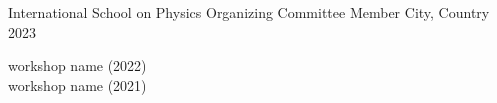 

\begin{cvhonors}

    
  \cvhonor
    {International School on Physics} %
    {Organizing Committee Member} %
    {City, Country} %
    {2023} %
    
\end{cvhonors}


\begin{small} \color{black}
workshop name (2022) \\
workshop name (2021) \\
\end{small}


